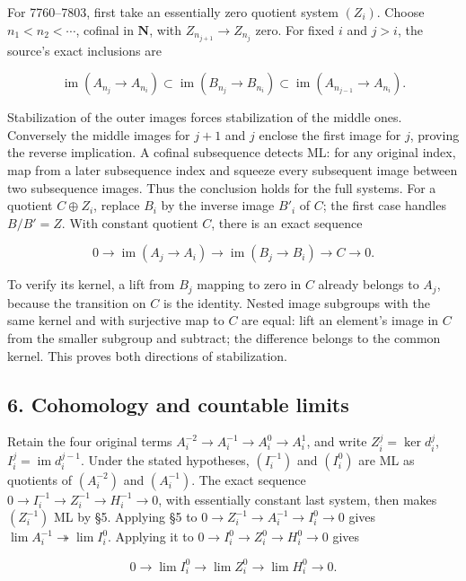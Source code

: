 For 7760--7803, first take an essentially zero quotient system \((Z_i)\). Choose \(n_1<n_2<\cdots\), cofinal in \(\mathbf N\), with \(Z_{n_{j+1}}\to Z_{n_j}\) zero. For fixed \(i\) and \(j>i\), the source's exact inclusions are

\[
\operatorname{im}(A_{n_j}\to A_{n_i})
\subset\operatorname{im}(B_{n_j}\to B_{n_i})
\subset\operatorname{im}(A_{n_{j-1}}\to A_{n_i}).
\]

Stabilization of the outer images forces stabilization of the middle ones. Conversely the middle images for \(j+1\) and \(j\) enclose the first image for \(j\), proving the reverse implication. A cofinal subsequence detects ML: for any original index, map from a later subsequence index and squeeze every subsequent image between two subsequence images. Thus the conclusion holds for the full systems. For a quotient \(C\oplus Z_i\), replace \(B_i\) by the inverse image \(B'_i\) of \(C\); the first case handles \(B/B'=Z\). With constant quotient \(C\), there is an exact sequence

\[
0\to\operatorname{im}(A_j\to A_i)
\to\operatorname{im}(B_j\to B_i)\to C\to0.
\]

To verify its kernel, a lift from \(B_j\) mapping to zero in \(C\) already belongs to \(A_j\), because the transition on \(C\) is the identity. Nested image subgroups with the same kernel and with surjective map to \(C\) are equal: lift an element's image in \(C\) from the smaller subgroup and subtract; the difference belongs to the common kernel. This proves both directions of stabilization.

\subsection{6. Cohomology and countable limits}\label{note-09-cohomology-and-countable-limits}

Retain the four original terms \(A_i^{-2}\to A_i^{-1}\to A_i^0\to A_i^1\), and write \(Z_i^j=\ker d_i^j\), \(I_i^j=\operatorname{im}d_i^{j-1}\). Under the stated hypotheses, \((I_i^{-1})\) and \((I_i^0)\) are ML as quotients of \((A_i^{-2})\) and \((A_i^{-1})\). The exact sequence \(0\to I_i^{-1}\to Z_i^{-1}\to H_i^{-1}\to0\), with essentially constant last system, then makes \((Z_i^{-1})\) ML by §5. Applying §5 to \(0\to Z_i^{-1}\to A_i^{-1}\to I_i^0\to0\) gives \(\lim A_i^{-1}\twoheadrightarrow\lim I_i^0\). Applying it to \(0\to I_i^0\to Z_i^0\to H_i^0\to0\) gives

\[
0\to\lim I_i^0\to\lim Z_i^0\to\lim H_i^0\to0.
\]

